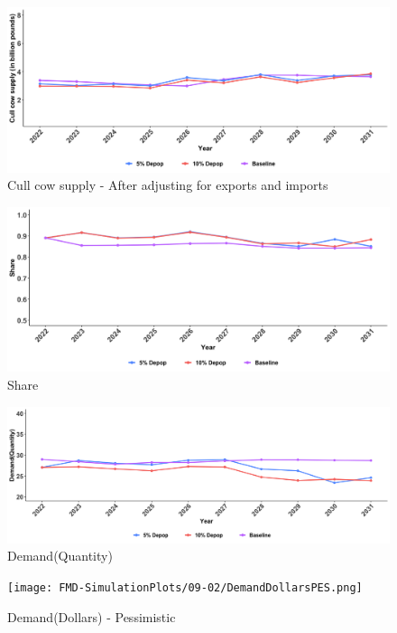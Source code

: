 \documentclass[
]{article}
\begin{document}
\begin{figure}
  \includegraphics[width=1.1\linewidth]{FMD-SimulationPlots/09-02/ClSupplyPESDOM.png}
  \caption{Cull cow supply - After adjusting for exports and imports}
\end{figure}

\begin{figure}
  \includegraphics[width=1.1\linewidth]{FMD-SimulationPlots/09-02/SharePES.png}
  \caption{Share}
\end{figure}

\begin{figure}
  \includegraphics[width=1.1\linewidth]{FMD-SimulationPlots/09-01/DemandQuantityPES.png}
  \caption{Demand(Quantity)}
\end{figure}

\begin{figure}
  \texttt{[image: FMD-SimulationPlots/09-02/DemandDollarsPES.png]}
  \caption{Demand(Dollars) - Pessimistic}
\end{figure}
\end{document}
